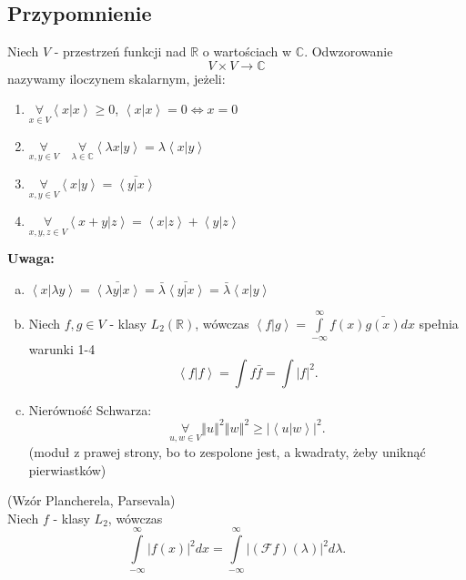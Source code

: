 \documentclass[../main.tex]{subfiles}
\begin{document}
    \subsection{Przypomnienie}
    Niech $V$ - przestrzeń funkcji nad $\mathbb{R}$ o wartościach w $\mathbb{C}$. Odwzorowanie
    \[
        V\times V\to \mathbb{C}
    \]
    nazywamy iloczynem skalarnym, jeżeli:
    \begin{enumerate}
        \item $\underset{x\in V}{\forall} \left<x | x \right> \ge 0$, $\left<x | x \right> = 0 \iff x = 0$
        \item $\underset{x,y\in V}{\forall} \quad \underset{\lambda\in \mathbb{C}}{\forall} \left<\lambda x | y \right> = \lambda \left<x|y \right>$
        \item $\underset{x,y\in V}{\forall} \left<x|y \right> = \bar{\left<y|x \right>}$
        \item $\underset{x,y,z\in V}{\forall} \left<x+y|z \right> = \left<x|z \right> + \left<y|z \right>$
    \end{enumerate}
    \textbf{Uwaga:}
    \begin{enumerate}[a)]
        \item $\left<x | \lambda y \right> = \bar{\left< \lambda y | x \right>} = \bar{\lambda} \bar{\left<y|x \right>} = \bar{\lambda}\left<x|y \right>$
        \item Niech $f, g\in V$ - klasy $L_2(\mathbb{R})$, wówczas $\left<f|g \right> = \int\limits_{-\infty}^{\infty} f(x)\bar{g(x)}dx $ spełnia warunki 1-4
            \[
                \left<f|f \right> = \int f \bar{f} = \int |f|^2
            .\]
    \item Nierówność Schwarza:
        \[
            \underset{u,w\in V}{\forall} \left\Vert u \right\Vert^2 \left\Vert w \right\Vert^2 \ge \left|\left<u|w \right>\right|^2
        .\]
    (moduł z prawej strony, bo to zespolone jest, a kwadraty, żeby uniknąć pierwiastków)
    \end{enumerate}
    \begin{tw}
        (Wzór Plancherela, Parsevala)\\
        Niech $f$ - klasy $L_2$, wówczas
        \[
            \int\limits_{-\infty}^{\infty} \left| f(x) \right| ^2 dx = \int\limits_{-\infty}^{\infty} \left| \left( \mathcal{F}f \right) (\lambda) \right| ^2 d \lambda
        .\]
    \end{tw}
\end{document}
